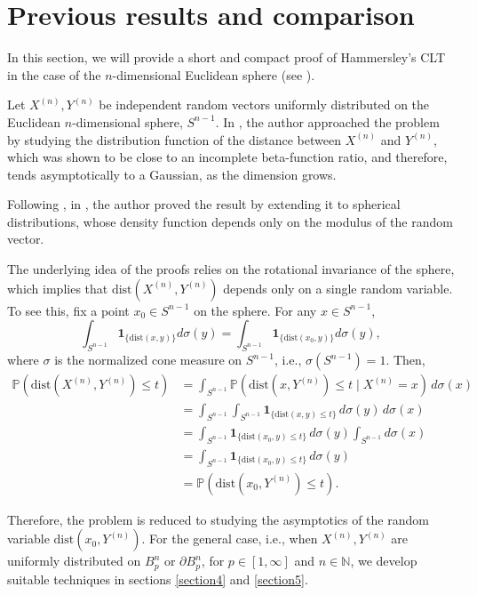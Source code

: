 \documentclass[10pt]{amsart}
\def\N{\mathbb{N}}
\def\dist{\text{dist}}
\numberwithin{equation}{section}
\begin{document}
\section{Previous results and comparison}
\label{section3}

In this section, we will provide a short and compact proof of Hammersley's CLT in the case of the $n$-dimensional Euclidean sphere (see \cite{H}).

Let $X^{(n)} , Y^{(n)}$ be independent random vectors uniformly distributed on the Euclidean $n$-dimensional sphere, $S^{n-1}$. In \cite{H}, the author approached the problem by studying the distribution function of the distance between $X^{(n)}$ and $Y^{(n)}$, which was shown to be close to an incomplete beta-function ratio, and therefore, tends asymptotically to a Gaussian, as the dimension grows.

Following \cite{H}, in \cite{L}, the author proved the result by extending it to spherical distributions, whose density function depends only on the modulus of the random vector.

The underlying idea of the proofs relies on the rotational invariance of the sphere, which implies that $\dist(X^{(n)},Y^{(n)})$ depends only on a single random variable. To see this, fix a point $x_0 \in S^{n-1}$ on the sphere. For any $x\in S^{n-1}$,
$$ \int _{S^{n-1}} \mathbf{1}_{ \lbrace \dist(x,y) \rbrace }  d \sigma(y) =  \int _{S^{n-1}} \mathbf{1}_{ \lbrace \dist(x_0,y) \rbrace } d\sigma(y), $$
where $\sigma$ is the normalized cone measure on $S^{n-1}$, i.e., $\sigma (S^{n-1}) = 1$. 
Then, 
\begin{align*}
\mathbb{P} (\dist (X^{(n)}, Y^{(n)}) \leq t) & = \int_{S^{n-1}} \mathbb{P} (\dist(x, Y^{(n)}) \leq t \mid X^{(n)} = x)  \, d\sigma(x)
 \\
 & =  \int_{S^{n-1}} \int_{S^{n-1}} \mathbf{1}_{\{\dist(x, y) \leq t\}} \, d \sigma(y) \, d\sigma(x)
 \\
 & =  \int_{S^{n-1}}  \mathbf{1}_{\{\dist(x_0, y) \leq t\}} \, d\sigma(y) \int_{S^{n-1}}  d\sigma(x)
 \\
 & =  \int_{S^{n-1}} \mathbf{1}_{\{\dist(x_0, y) \leq t\}} \, d\sigma(y)
 \\
 & = \mathbb{P} (\dist(x_0, Y^{(n)}) \leq t).
\end{align*}



Therefore, the problem is reduced to studying the asymptotics of the random variable $\dist(x_0, Y^{(n)})$. For the general case, i.e., when $X^{(n)} , Y^{(n)}$ are uniformly distributed on $B_p^ n$ or $\partial B_p^n$, for $p\in [1, \infty]$ and $n \in \N$, we develop suitable techniques in sections \ref{section4} and \ref{section5}.
\end{document}
